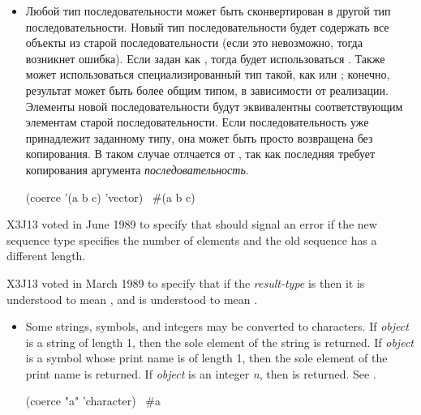 \begin{defun}[Function]
\begin{itemize}
\item
Любой тип последовательности может быть сконвертирован в другой тип
последовательности. Новый тип последовательности будет содержать все
 объекты из старой последовательности (если это невозможно, тогда возникнет
ошибка). Если  задан как , тогда будет использоваться
. Также может использоваться специализированный тип такой, как  или ; конечно, результат может быть более общим типом, в
зависимости от реализации.
Элементы новой последовательности будут эквивалентны  соответствующим
элементам старой последовательности.
Если последовательность уже принадлежит заданному типу, она может быть просто
возвращена без копирования. В таком случае  отлчается от , так как последняя требует
копирования аргумента \emph{последовательность}.

\begin{lisp}
(coerce '(a b c) 'vector) \EV\ \#(a b c)
\end{lisp}

\end{itemize}

\begin{newer}
X3J13 voted in June 1989  to specify that
 should signal an error if the new sequence type specifies the
number of elements and the old sequence has a different length.
\end{newer}

\begin{newer}
X3J13 voted in March 1989 
to specify that if the \emph{result-type} is 
then it is understood to mean ,
and  is understood to mean .
\end{newer}

\begin{obsolete}
\begin{itemize}
\item
Some strings, symbols, and integers may be converted to characters.
If \emph{object} is a string of length 1, then the
sole element of the string is returned.  If \emph{object} is a symbol
whose print name is of length 1, then the sole element of the print name
is returned.  If \emph{object} is an integer \emph{n}, then 
is returned.  See .
\begin{lisp}
(coerce "a" 'character) \EV\ \#{\Xbackslash}a
\end{lisp}
\end{itemize}
\end{obsolete}


\end{defun}
